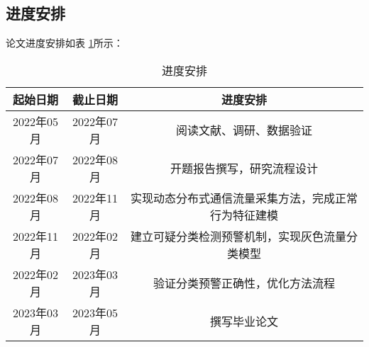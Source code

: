  
\subsection{进度安排}
论文进度安排如表 \ref{table:进度安排}所示：


\begin{table}[htbp]
	\centering
	\caption{进度安排}\label{table:进度安排}
	\vspace{0.5em}\wuhao
	\begin{tabular}{ccc}
		\toprule
		起始日期        & 截止日期     & 进度安排    \\
		\midrule
		2022年05月           & 2022年07月           & 阅读文献、调研、数据验证      \\
		2022年07月          & 2022年08月      & 开题报告撰写，研究流程设计  \\
		2022年08月         & 2022年11月        & 实现动态分布式通信流量采集方法，完成正常行为特征建模  \\
		2022年11月         & 2022年02月     & 建立可疑分类检测预警机制，实现灰色流量分类模型  \\
		2022年02月           & 2023年03月   & 验证分类预警正确性，优化方法流程 \\
		2023年03月          & 2023年05月     &      撰写毕业论文     \\


		\bottomrule
	\end{tabular}
\end{table}


\FloatBarrier




